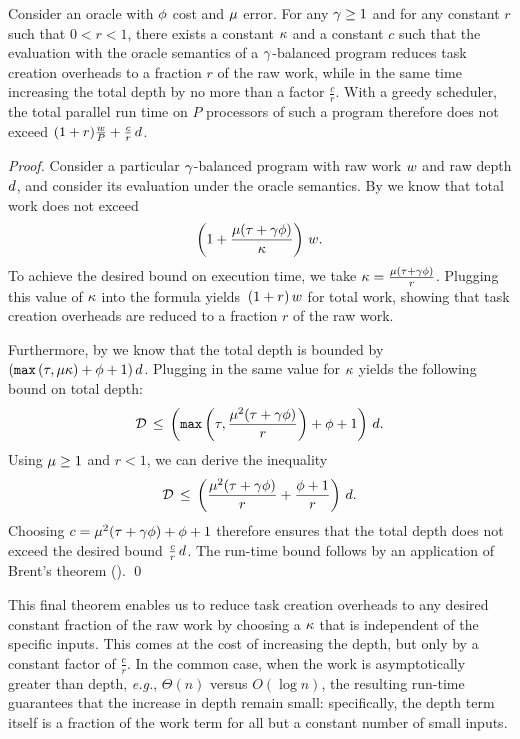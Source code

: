 \begin{theorem}
\label{thm:task-creation-overheads}
Consider an oracle with ${\phi}$ cost and ${\mu}$ error.
For any ${\gamma}\geq 1$ and for any constant $r$ such that $0 < r < 1$,
there exists a constant ${\kappa}$ and a constant $c$
such that the evaluation with 
the oracle semantics of a ${\gamma}$-balanced program 
reduces task creation overheads to a fraction $r$ of the
raw work, while in the same time increasing the total depth 
by no more than a factor $\frac{c}{r}$.
With a greedy scheduler, the total parallel
run time on $P$ processors of such a program
therefore does not exceed
$(1 + r) \frac{w}{P} + \frac{c}{r}\, d$.  
%
\end{theorem}
\begin{proof}
Consider a particular ${\gamma}$-balanced program 
with raw work $w$ and raw depth $d$,
and consider its evaluation under the oracle semantics.  
%
By  we know that total work does not exceed
\[
\left(1+\frac{{\mu}({\tau}+{\gamma}{\phi})}{{\kappa}} \right)\,{w}.
\]
To achieve the desired bound on execution time, we take 
 ${\kappa} = \frac{{\mu}({\tau} + {\gamma}{\phi})}{r}$.
Plugging this value of ${\kappa}$ into the formula
yields~$(1+r)\,{w}$ for total work, showing
that task creation overheads are reduced to a fraction $r$ of
the raw work.

Furthermore, by  we know that the total depth 
is bounded by $({\mathtt{{max}}}\left({\tau},{\mu}{\kappa}\right)+{\phi}+1)\,d$. Plugging in 
the same value for ${\kappa}$ yields the following bound on total depth:
\[
{\mathcal{D}} \, \leq \, \left({\mathtt{{max}}}\left({\tau},\frac{{\mu}^2({\tau} +
    {\gamma}{\phi})}{r}\right)+{\phi} + 1\right)\,d.
\]
Using ${\mu} \ge 1$ and $r < 1$,
we can derive the inequality
\[
{\mathcal{D}} \, \leq \, \left(\frac{{\mu}^2({\tau} + {\gamma}{\phi})}{r}+\frac{{\phi}+1}{r}\right)\,d.
\]
Choosing $c = {\mu}^2({\tau} + {\gamma}{\phi})+{\phi}+1$ 
therefore ensures that the total depth does not exceed the desired bound
$\frac{c}{r}\,d$.
The run-time bound follows by an application of 
Brent's theorem (). \qed
\end{proof}

This final theorem enables us to reduce task creation overheads to any
desired constant fraction of the raw work by choosing a ${\kappa}$ that
is independent of the specific inputs.  This comes at the cost
of increasing the depth, but only by a constant factor of
$\frac{c}{r}$.  In the common case, when the work is
asymptotically greater than depth, \textit{e.g.}, $\Theta(n)$ versus
$O(\log{n})$, the resulting run-time guarantees that the increase in
depth remain small: specifically, the depth term itself is a fraction
of the work term for all but a constant number of small inputs.  


